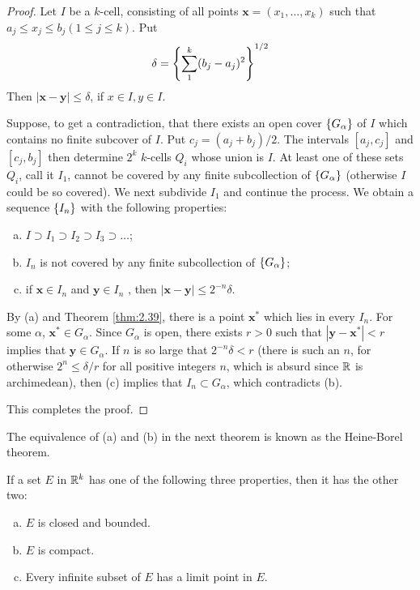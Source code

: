 \begin{proof}
    Let $I$ be a $k$-cell,
    consisting of all points $\mathbf{x} = (x_1, \dots, x_k)$
    such that $a_j \leq x_j \leq  b_j (1 \leq j \leq k)$.
    Put
    \begin{equation*}
        \delta =
        \left\protect\{ \sum_{1}^{k} (b_j - a_j)^2 \right\}^{1/2}
    \end{equation*}
    Then $ \left| \mathbf{x-y} \right| \leq \delta$, if $x \in I, y \in I$.

    Suppose, to get a contradiction,
    that there exists an open cover $\protect\{G_\alpha\}$ of $I$
    which contains no finite subcover of $I$.
    Put $c_j = (a_j + b_j)/2$.
    The intervals $[a_j , c_j]$ and $[c_j , b_j]$
    then determine $2^k$ $k$-cells $Q_i$ whose union is $I$.
    At least one of these sets $Q_i$, call it $I_1$,
    cannot be covered by any finite subcollection of $\protect\{G_\alpha\}$
    (otherwise $I$ could be so covered).
    We next subdivide $I_1$ and continue the process.
    We obtain a sequence $\protect\{I_n\}$ with the following properties:
    \begin{enumerate}[(a)]
        \item $I \supset I_1 \supset I_2 \supset I_3 \supset \dots$;
        \item $I_n$ is not covered by any finite subcollection of $\protect\{G_\alpha\}$;
        \item if $\mathbf{x} \in I_n$ and $\mathbf{y} \in I_n$ , then $\left| \mathbf{x-y} \right| \leq 2^{-n}\delta$.
    \end{enumerate}

    By (a) and Theorem \ref{thm:2.39}, there is a point $\mathbf{x}^*$ which lies in every $I_n$.
    For some $\alpha$, $\mathbf{x}^* \in G_\alpha$.
    Since $G_\alpha$ is open, there exists $r > 0$ such that
    $\left| \mathbf{y-x}^* \right| < r$ implies that $\mathbf{y} \in G_\alpha$.
    If $n$ is so large that $2^{-n}\delta < r$
    (there is such an $n$, for otherwise $2^n \leq \delta/r$ for all positive integers $n$, which is absurd since ${\protect\mathbb R}$ is archimedean),
    then (c) implies that $I_n \subset G_\alpha$, which contradicts (b).

    This completes the proof.
\end{proof}

The equivalence of (a) and (b) in the next theorem is known as the Heine-Borel theorem.

\begin{thm}
    \label{thm:2.41}
    If a set $E$ in ${\protect\mathbb R}^k$ has one of the following three properties, then it has the other two:
    \begin{enumerate}[(a)]
        \item $E$ is closed and bounded.
        \item $E$ is compact.
        \item Every infinite subset of $E$ has a limit point in $E$.
    \end{enumerate}
\end{thm}

